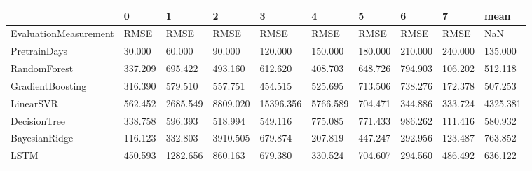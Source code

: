 \begin{tabular}{llllllllll}
\toprule
{} &       0 &        1 &        2 &         3 &        4 &       5 &       6 &       7 &     mean \\
\midrule
EvaluationMeasurement &    RMSE &     RMSE &     RMSE &      RMSE &     RMSE &    RMSE &    RMSE &    RMSE &      NaN \\
PretrainDays          &  30.000 &   60.000 &   90.000 &   120.000 &  150.000 & 180.000 & 210.000 & 240.000 &  135.000 \\
RandomForest          & 337.209 &  695.422 &  493.160 &   612.620 &  408.703 & 648.726 & 794.903 & 106.202 &  512.118 \\
GradientBoosting      & 316.390 &  579.510 &  557.751 &   454.515 &  525.695 & 713.506 & 738.276 & 172.378 &  507.253 \\
LinearSVR             & 562.452 & 2685.549 & 8809.020 & 15396.356 & 5766.589 & 704.471 & 344.886 & 333.724 & 4325.381 \\
DecisionTree          & 338.758 &  596.393 &  518.994 &   549.116 &  775.085 & 771.433 & 986.262 & 111.416 &  580.932 \\
BayesianRidge         & 116.123 &  332.803 & 3910.505 &   679.874 &  207.819 & 447.247 & 292.956 & 123.487 &  763.852 \\
LSTM                  & 450.593 & 1282.656 &  860.163 &   679.380 &  330.524 & 704.607 & 294.560 & 486.492 &  636.122 \\
\bottomrule
\end{tabular}
